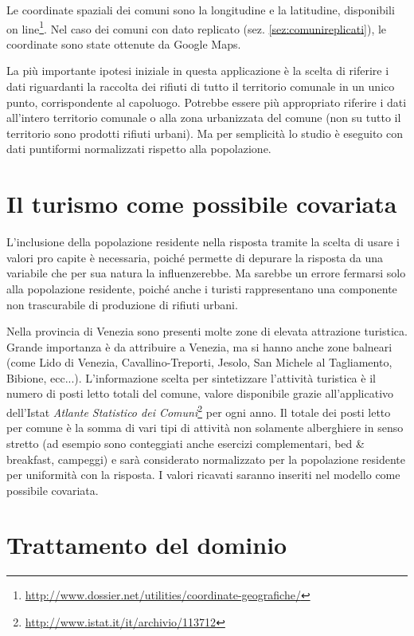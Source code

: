\documentclass[a4paper,11pt,twoside,openright]{book}							%
\begin{document}
Le coordinate spaziali dei comuni sono la longitudine e la latitudine, disponibili on line\footnote{\href{http://www.dossier.net/utilities/coordinate-geografiche/}{http://www.dossier.net/utilities/coordinate-geografiche/}}. Nel caso dei comuni con dato replicato (sez. \ref{sez:comunireplicati}), le coordinate sono state ottenute da Google Maps.

La più importante ipotesi iniziale in questa applicazione è la scelta di riferire i dati riguardanti la raccolta dei rifiuti di tutto il territorio comunale in un unico punto, corrispondente al capoluogo. Potrebbe essere più appropriato riferire i dati all'intero territorio comunale o alla zona urbanizzata del comune (non su tutto il territorio sono prodotti rifiuti urbani). Ma per semplicità lo studio è eseguito con dati puntiformi normalizzati rispetto alla popolazione. 

\section{Il turismo come possibile covariata}

L'inclusione della popolazione residente nella risposta tramite la scelta di usare i valori pro capite è necessaria, poiché permette di depurare la risposta da una variabile che per sua natura la influenzerebbe. Ma sarebbe un errore fermarsi solo alla popolazione residente, poiché anche i turisti rappresentano una componente non trascurabile di produzione di rifiuti urbani.

Nella provincia di Venezia sono presenti molte zone di elevata attrazione turistica. Grande importanza è da attribuire a Venezia, ma si hanno anche zone balneari (come Lido di Venezia, Cavallino-Treporti, Jesolo, San Michele al Tagliamento, Bibione, ecc...). L'informazione scelta per sintetizzare l'attività turistica è il numero di posti letto totali del comune, valore disponibile grazie all'applicativo dell'Istat \textit{Atlante Statistico dei Comuni}\footnote{\href{http://www.istat.it/it/archivio/113712}{http://www.istat.it/it/archivio/113712}} per ogni anno. Il totale dei posti letto per comune è la somma di vari tipi di attività non solamente alberghiere in senso stretto (ad esempio sono conteggiati anche esercizi complementari, bed \& breakfast, campeggi) e sarà considerato normalizzato per la popolazione residente per uniformità con la risposta. I valori ricavati saranno inseriti nel modello come possibile covariata.


\section{Trattamento del dominio}
\end{document}
